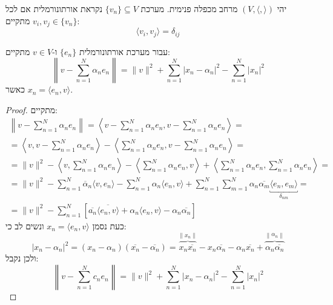 \documentclass{tstextbook}
\begin{document}
\begin{definition}
יהי \(\left( V,\langle , \rangle \right)\) מרחב מכפלה פנימית. מערכת \(\{ v_{n} \}\subseteq V\) נקראת אורתונורמלית אם לכל \(v_{i},v_{j}\in \{ v_{n} \}\) מתקיים:
$$\langle v_{i},v_{j} \rangle =\delta_{ij}$$

\end{definition}
\begin{lemma}
עבור מערכת אורתונורמלית \(\{ e_{n} \}\) ו-\(v \in V\) מתקיים:
$$\left\lVert  v-\sum_{n=1}^{N} \alpha_{n}e_{n}  \right\rVert =\|v\|^{2}+\sum_{n=1}^{N}\left|x_{n}-\alpha_{n}\right|^{2}-\sum_{n=1}^{N}\left|x_{n}\right|^{2}$$
כאשר \(x_{n}=\langle e_{n},v \rangle\).

\end{lemma}
\begin{proof}
מתקיים:
\begin{gather*}\left\lVert  v-\sum_{n=1}^{N} \alpha_{n}e_{n}  \right\rVert =\left\langle v-\sum_{n=1}^{N}\alpha_{n}e_{n},v-\sum_{n=1}^{N}\alpha_{n}e_{n}\right\rangle= \\=\left\langle  v,v-\sum_{n=1}^{N} \alpha_{n}e_{n}  \right\rangle -\left\langle  \sum_{n=1}^{N} \alpha_{n}e_{n},v-\sum_{n=1}^{N} \alpha_{n}e_{n}  \right\rangle = \\= \lVert v \rVert^{2}-\left\langle  v, \sum_{n=1}^{N} \alpha_{n}e_{n}  \right\rangle  -\left\langle  \sum_{n=1}^{N} \alpha_{n}e_{n},v  \right\rangle+\left\langle  \sum_{n=1}^{N} \alpha_{n}e_{n},\sum_{n=1}^{N} \alpha_{n}e_{n}  \right\rangle  = \\=\lVert v \rVert ^{2}-\sum_{n=1}^{N}  \overline{\alpha} _{n}\langle v,e_{n} \rangle -\sum_{n=1}^{N} \alpha_{n}\langle e_{n},v \rangle +\sum_{n=1}^{N}\sum_{m=1}^{N}\alpha_{n}\overline{\alpha_{m}} \underbracket{ \langle e_{n},e_{m} \rangle }_{ \delta_{nm} } = \\=\lVert v \rVert ^{2}-\sum_{n=1}^{N} \left[  \overline{a_{n}} \overline{\langle e_{n},v \rangle }  +\alpha_{n}\langle e_{n},v \rangle -\alpha_{n}\overline{\alpha_{n}}   \right]
\end{gather*}
כעת נסמן \(x_{n}=\langle e_{n},v \rangle\) ונשים לב כי:
$$\left\lvert  x_{n}-\alpha_{n}  \right\rvert ^{2}=\left( x_{n}-\alpha_{n} \right)\left( \overline{x_{n}} -\overline{\alpha_{n}}  \right)=\overbrace{ x_{n}\overline{x_{n}} }^{ \lVert x_{n} \rVert  } -x_{n}\overline{\alpha_{n}} -\alpha_{n}\overline{x_{n}} +\overbrace{ \alpha_{n}\overline{\alpha_{n}} }^{ \left\lVert  \alpha_{n}  \right\rVert  } $$
ולכן נקבל:
$$\left\lVert  v-\sum_{n=1}^{N} c_{n}e_{n}  \right\rVert =
\|v\|^{2}+\sum_{n=1}^{N}\left|x_{n}-\alpha_{n}\right|^{2}-\sum_{n=1}^{N}\left|x_{n}\right|^{2}$$

\end{proof}
\end{document}
